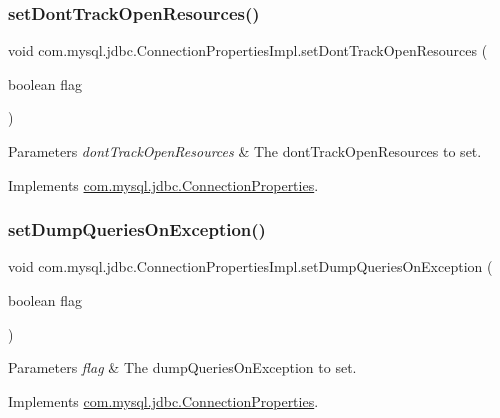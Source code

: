 \subsubsection{\texorpdfstring{set\+Dont\+Track\+Open\+Resources()}{setDontTrackOpenResources()}}
{\footnotesize\ttfamily void com.\+mysql.\+jdbc.\+Connection\+Properties\+Impl.\+set\+Dont\+Track\+Open\+Resources (\begin{DoxyParamCaption}\item[{boolean}]{flag }\end{DoxyParamCaption})}


\begin{DoxyParams}{Parameters}
{\em dont\+Track\+Open\+Resources} & The dont\+Track\+Open\+Resources to set. \\
\hline
\end{DoxyParams}


Implements \mbox{\hyperlink{interfacecom_1_1mysql_1_1jdbc_1_1_connection_properties_a71698dd42306aa0d570cda6344bc8680}{com.\+mysql.\+jdbc.\+Connection\+Properties}}.

\mbox{\label{classcom_1_1mysql_1_1jdbc_1_1_connection_properties_impl_a10091184059369f2348483fbcaf07d32}} 
\subsubsection{\texorpdfstring{set\+Dump\+Queries\+On\+Exception()}{setDumpQueriesOnException()}}
{\footnotesize\ttfamily void com.\+mysql.\+jdbc.\+Connection\+Properties\+Impl.\+set\+Dump\+Queries\+On\+Exception (\begin{DoxyParamCaption}\item[{boolean}]{flag }\end{DoxyParamCaption})}


\begin{DoxyParams}{Parameters}
{\em flag} & The dump\+Queries\+On\+Exception to set. \\
\hline
\end{DoxyParams}


Implements \mbox{\hyperlink{interfacecom_1_1mysql_1_1jdbc_1_1_connection_properties_a4bdf459325c8a9a96459959ea493f6a3}{com.\+mysql.\+jdbc.\+Connection\+Properties}}.

